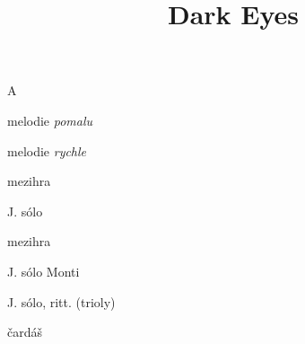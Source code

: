 \documentclass[timestamp]{jazzgrid}
\title{Dark Eyes}
\begin{document}
\maketitle
\begin{musicsection}{A}
\barline
	{\barfour{}
		{}
		{}
		{}
		{}
	}
	{\barfour{}
		{}
		{}
		{}
		{}
	}
	{\barfour{}
		{}
		{}
		{}
		{}
	}
	{\barfour{}
		{}
		{}
		{}
		{}
	}
\barline
	{\barfour{}
		{}
		{}
		{}
		{}
	}
	{\barfour{}
		{}
		{}
		{}
		{}
	}
	{\barfour{}
		{}
		{}
		{}
		{}
	}
	{\barfour{}
		{}
		{}
		{}
		{}
	}
\barline
	{\barfour{}
		{}
		{}
		{}
		{}
	}
	{\barfour{}
		{}
		{}
		{}
		{}
	}
	{\barfour{}
		{}
		{}
		{}
		{}
	}
	{\barfour{}
		{}
		{}
		{}
		{}
	}
\barline
	{\barfour{}
		{}
		{}
		{}
		{}
	}
	{\barfour{}
		{}
		{}
		{}
		{}
	}
	{\barfour{}
		{}
		{}
		{}
		{}
	}
	{\barfour{}
		{}
		{}
		{}
		{}
	}
\end{musicsection}

\begin{multicols*}{2}
\begin{description}[noitemsep,align=right,labelwidth=\widthof{\scriptsize\bfseries{2$\times$A}}]
	\scriptsize
	\item [A] melodie \emph{pomalu}
	\item [A] melodie \emph{rychle}
	\item [A] mezihra
	\item [2$\times$A] J. sólo
	\item [A] mezihra
	\item [A] J. sólo Monti
	\item [2$\times$A] J. sólo, ritt. (trioly)
	\item [A] čardáš
\end{description}
\end{multicols*}
\end{document}
